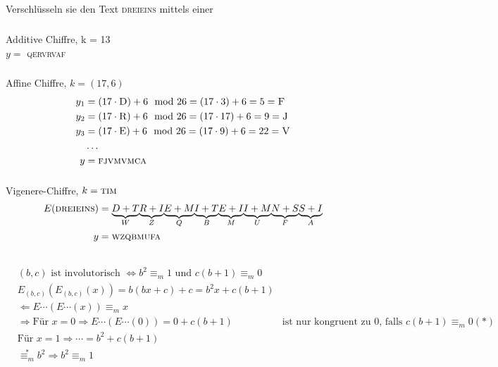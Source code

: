 \documentclass[mitschriften.tex]{subfiles}
\begin{document}
\subsection{}
Verschlüsseln sie den Text \textsc{dreieins} mittels einer
\subsubsection{} %
Additive Chiffre, k = 13\\
$ y = $ \textsc{qervrvaf}
\subsubsection{}
Affine Chiffre, $k = (17,6)$ \\
\begin{align*}
  y_1 &= (17\cdot \textsc{D})+6 \mod 26  = (17\cdot 3)+6 = 5 = \textsc{F} \\
  y_2 &= (17\cdot \textsc{R})+6 \mod 26  = (17\cdot 17)+6 = 9 = \textsc{J} \\
  y_3 &= (17\cdot \textsc{E})+6 \mod 26  = (17\cdot 9)+6  = 22 = \textsc {V} \\
  &\ldots \\
  y &= \textsc{fjvmvmca}
\end{align*}

\subsubsection{}
Vigenere-Chiffre, $k = \textsc{tim}$ \\
\begin{align*}
  E(\textsc{dreieins}) &= \underset{W}{\underbrace{D+T}} \underset{Z}{\underbrace{R+I}} \underset{Q}{\underbrace{E+M}} \underset{B}{\underbrace{I+T}} \underset{M}{\underbrace{E+I}} \underset{U}{\underbrace{I+M}} \underset{F}{\underbrace{N+S}} \underset{A}{\underbrace{S+I}}\\
  y &= \textsc{wzqbmufa}
\end{align*}

\subsection{}
\subsubsection{}
\begin{align*}
&(b,c) \text{ ist involutorisch } \Leftrightarrow  b^2 \equiv_m 1 \text{ und } c(b+1) \equiv_m 0\\
&E_{(b,c)}(E_{(b,c)}(x)) =  b(bx + c) + c = b^2x + c(b+1)\\
&\Leftarrow  E\cdots(E\cdots(x)) \equiv_m  x\\
&\Rightarrow \text{Für } x = 0 \Rightarrow  E\cdots(E\cdots (0)) = 0 + c(b+1) &\text{ist nur kongruent zu 0, falls } c(b+1)\equiv_m 0 (\ast)\\
&\text{Für } x=1 \Rightarrow  \cdots = b^2 + c(b+1)\\
&\overset{\ast}{\equiv_m} b^2 \Rightarrow b^2 \equiv_m 1\\
\end{align*}
\end{document}
